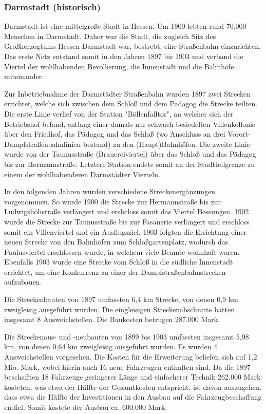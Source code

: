 \subsubsection*{Darmstadt (historisch)}

Darmstadt ist eine mittelgroße Stadt in Hessen. Um 1900 lebten rund 70.000 Menschen in
Darmstadt. Daher war die Stadt, die zugleich Sitz des Großherzogtums Hessen-Darmstadt
war, bestrebt, eine Straßenbahn einzurichten. Das erste Netz entstand somit in den
Jahren 1897 bis 1903 und verband die Viertel der wohlhabenden Bevölkerung, die
Innenstadt und die Bahnhöfe miteinander.

Zur Inbetriebnahme der Darmstädter Straßenbahn wurden 1897 zwei Strecken errichtet,
welche sich zwischen dem Schloß und dem Pädagog die Strecke teilten. Die erste Linie
verlief von der Station "Böllenfalltor", an welcher sich der Betriebshof befand, entlang
einer damals nur schwach besiedelten Villenkollonie über den Friedhof, das Pädagog und
das Schloß (wo Anschluss an drei Vorort-Dampfstraßenbahnlinien bestand) zu den
(Haupt)Bahnhöfen. Die zweite Linie wurde von der Taunusstraße (Brauereiviertel) über das
Schloß und das Pädagog bis zur Hermannstraße. Letztere Station endete somit an der
Stadtteilgrenze zu einem der wohlhabenderen Darmstädter Vierteln.

In den folgenden Jahren wurden verschiedene Streckenergänzungen vorgenommen. So wurde
1900 die Strecke zur Hermannstraße bis zur Ludwigshöhstraße verlängert und ershcloss
somit das Viertel Bessungen. 1902 wurde die Strecke zur Taunusstraße bis zur Fasanerie
verlängert und erschloss somit ein Villenviertel und ein Ausflugsziel. 1903 folgten die
Errichtung einer neuen Strecke von den Bahnhöfen zum Schloßgartenplatz, wodurch das
Paulusviertel erschlossen wurde, in welchem viele Beamte wohnhaft waren. Ebenfalls 1903
wurde eine Strecke vom Schloß in die südliche Innenstadt errichtet, um eine Konkurrenz zu
einer der Dampfstraßenbahnstrecken aufzubauen.

Die Streckenbauten von 1897 umfassten 6,4 km Strecke, von denen 0,9 km zweigleisig
ausgeführt wurden. Die eingleisigen Streckenabschnitte hatten insgesamt 8 Ausweichstellen.
Die Baukosten betrugen 287.000 Mark.

Die Streckenaus- und -neubauten von 1899 bis 1903 umfassten insgesamt 5,98 km, von denen
0,64 km zweigleisig ausgeführt wurden. Es wurden 4 Ausweichstellen vorgesehen. Die Kosten
für die Erweiterung beliefen sich auf 1,2 Mio. Mark, wobei hierin auch 16 neue Fahrzeugen
enthalten sind. Da die 1897 beschafften 18 Fahrzeuge geringerer Länge und einfacherer
Technik 262.000 Mark kosteten, was etwa der Hälfte der Gesamtkosten entspricht, ist davon
auszugehen, dass etwa die Hälfte der Investitionen in den Ausbau auf die
Fahrzeugbeschaffung entfiel. Somit kostete der Ausbau ca. 600.000 Mark.

